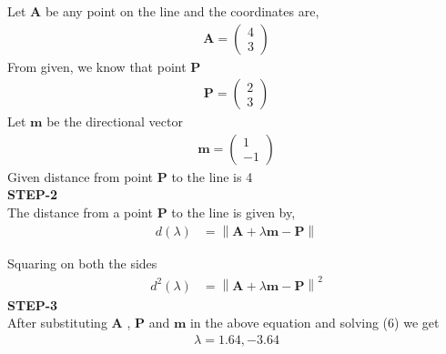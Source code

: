 \documentclass[10pt,a4paper]{report}
\newcommand{\myvec}[1]{\ensuremath{\begin{pmatrix}#1\end{pmatrix}}}
\let\vec\mathbf
\providecommand{\norm}[1]{\left\lVert#1\right\rVert}
\let\vec\mathbf
\providecommand{\brak}[1]{\ensuremath{\left(#1\right)}}
\begin{document}
\begin{multicols}{2}
Let $\vec{A}$ be any point on the line and the coordinates are,\vspace{1mm}
\begin{align}
    \vec{A}=\myvec{
    4\\
    3
    } 
\end{align}
 \vspace{2mm}
From given, we know that point $\vec{P}$ \\
\begin{align}
    \vec{P}=\myvec{
    2\\
    3
    } 
\end{align} \vspace{2mm}
Let $\vec{m}$ be the directional vector \\\vspace{1mm}
\begin{align}
    \vec{m}=\myvec{
    1\\
    -1
    } 
\end{align}
Given distance from point $\vec{P}$ to the line is 4\\
\vspace{5mm}
\textbf{STEP-2}\vspace{5mm}\\
The distance from a point  $\vec{P}$ to the line is given by, \\ \vspace{1mm}
\begin{align}
	\label{dist_3d_def}
	d\brak{\lambda } &=\norm{\vec{A} + \lambda \vec{m}-\vec{P}}
\end{align}
 \vspace{1mm}

Squaring on both the sides \\ \vspace{2mm}
\begin{align}
 	d^2\brak{\lambda } &=\norm{\vec{A} + \lambda \vec{m}-\vec{P}}^2
\end{align}
\vspace{5mm}
\textbf{STEP-3}\vspace{2mm}\\
After substituting $\vec{A}$ , $\vec{P}$ and $\vec{m}$ in the above equation and solving (6) we get 
\begin{align}
{\lambda }=1.64, -3.64
\end{align}
\vspace{5mm}


\end{multicols}
\end{document}
